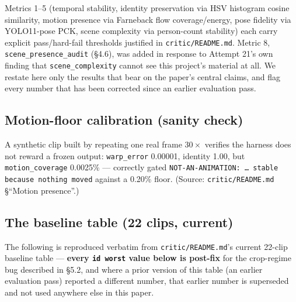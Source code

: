 \documentclass[11pt]{article}
\newcommand{\secsym}{\S}
\begin{document}
Metrics 1--5 (temporal stability, identity preservation via HSV histogram
cosine similarity, motion presence via Farneback flow coverage/energy,
pose fidelity via YOLO11-pose PCK, scene complexity via person-count
stability) each carry explicit pass/hard-fail thresholds justified in
\texttt{critic/README.md}. Metric 8, \texttt{scene\_presence\_audit}
(\secsym4.6), was added in response to Attempt 21's own finding that
\texttt{scene\_complexity} cannot see this project's material at all. We
restate here only the results that bear on the paper's central claims, and
flag every number that has been corrected since an earlier evaluation
pass.

\subsection{Motion-floor calibration (sanity check)}
\label{sec:motionfloor}

A synthetic clip built by repeating one real frame $30\times$ verifies the
harness does not reward a frozen output: \texttt{warp\_error} 0.00001,
identity 1.00, but \texttt{motion\_coverage} 0.0025\% --- correctly gated
\texttt{NOT-AN-ANIMATION: \ldots\ stable because nothing moved} against a
0.20\% floor. (Source: \texttt{critic/README.md} \secsym``Motion
presence''.)

\subsection{The baseline table (22 clips, current)}
\label{sec:baselinetable}

The following is reproduced verbatim from \texttt{critic/README.md}'s
current 22-clip baseline table --- \textbf{every \texttt{id worst} value
below is post-fix} for the crop-regime bug described in \secsym5.2, and
where a prior version of this table (an earlier evaluation pass) reported
a different number, that earlier number is superseded and not used
anywhere else in this paper.
\end{document}
